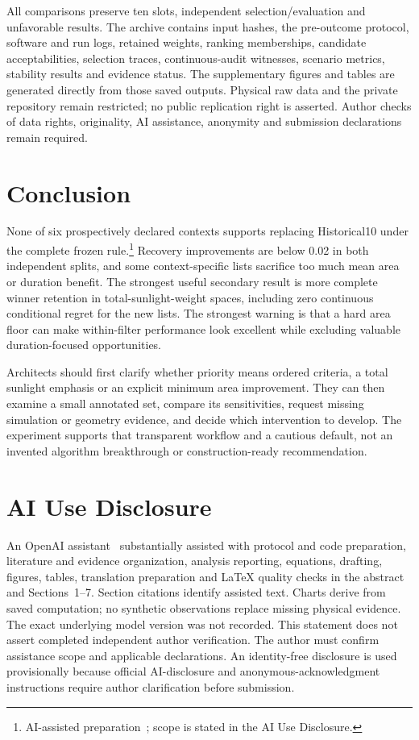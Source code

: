 \documentclass{llncs}
\newcommand{\aidraft}{\footnote{AI-assisted preparation~\cite{openai2026}; scope is stated in the AI Use Disclosure.}}
\begin{document}
All comparisons preserve ten slots, independent selection/evaluation and unfavorable results. The archive contains input hashes, the pre-outcome protocol, software and run logs, retained weights, ranking memberships, candidate acceptabilities, selection traces, continuous-audit witnesses, scenario metrics, stability results and evidence status. The supplementary figures and tables are generated directly from those saved outputs. Physical raw data and the private repository remain restricted; no public replication right is asserted. Author checks of data rights, originality, AI assistance, anonymity and submission declarations remain required.

\section{Conclusion}
None of six prospectively declared contexts supports replacing Historical10 under the complete frozen rule.\aidraft{} Recovery improvements are below 0.02 in both independent splits, and some context-specific lists sacrifice too much mean area or duration benefit. The strongest useful secondary result is more complete winner retention in total-sunlight-weight spaces, including zero continuous conditional regret for the new lists. The strongest warning is that a hard area floor can make within-filter performance look excellent while excluding valuable duration-focused opportunities.

Architects should first clarify whether priority means ordered criteria, a total sunlight emphasis or an explicit minimum area improvement. They can then examine a small annotated set, compare its sensitivities, request missing simulation or geometry evidence, and decide which intervention to develop. The experiment supports that transparent workflow and a cautious default, not an invented algorithm breakthrough or construction-ready recommendation.

\section*{AI Use Disclosure}
An OpenAI assistant~\cite{openai2026} substantially assisted with protocol and code preparation, literature and evidence organization, analysis reporting, equations, drafting, figures, tables, translation preparation and LaTeX quality checks in the abstract and Sections~1--7. Section citations identify assisted text. Charts derive from saved computation; no synthetic observations replace missing physical evidence. The exact underlying model version was not recorded. This statement does not assert completed independent author verification. The author must confirm assistance scope and applicable declarations. An identity-free disclosure is used provisionally because official AI-disclosure and anonymous-acknowledgment instructions require author clarification before submission.
\FloatBarrier
\end{document}
